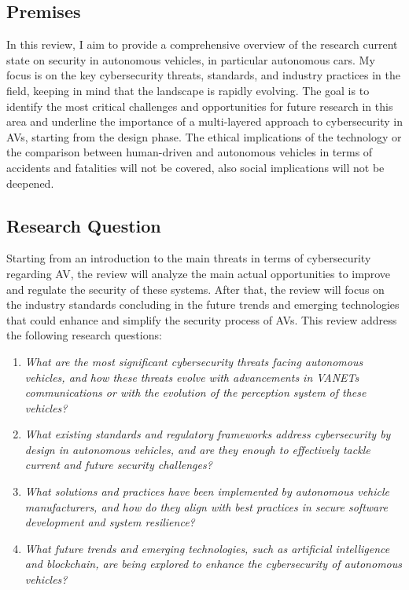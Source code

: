 \subsection{Premises}\label{subsec:premises}

In this review,
I aim to provide a comprehensive overview of the research current state on security in autonomous vehicles,
in particular autonomous cars.
My focus is on the key cybersecurity threats, standards, and industry practices in the field,
keeping in mind that the landscape is rapidly evolving.
The goal is to identify the most critical challenges and opportunities for future research in this area
and underline the importance of a multi-layered approach to cybersecurity in AVs, starting from the design phase.
The ethical implications of the technology or the comparison between human-driven and autonomous vehicles in terms of accidents and fatalities will not be covered,
also social implications will not be deepened.

\subsection{Research Question}\label{subsec:research-question}

Starting from an introduction to the main threats in terms of cybersecurity regarding AV, the review will analyze the main actual opportunities to improve and regulate the security of these systems.
After that, the review will focus on the industry standards concluding in the future trends and emerging technologies that could enhance and simplify the security process of AVs.
This review address the following research questions:

\begin{enumerate}
    \item \textit{What are the most significant cybersecurity threats facing autonomous vehicles, and how these threats evolve with advancements in VANETs communications or with the evolution of the perception system of these vehicles?}
    \item \textit{What existing standards and regulatory frameworks address cybersecurity by design in autonomous vehicles, and are they enough to effectively tackle current and future security challenges?}
    \item \textit{What solutions and practices have been implemented by autonomous vehicle manufacturers, and how do they align with best practices in secure software development and system resilience?}
    \item \textit{What future trends and emerging technologies, such as artificial intelligence and blockchain, are being explored to enhance the cybersecurity of autonomous vehicles?}
\end{enumerate}

